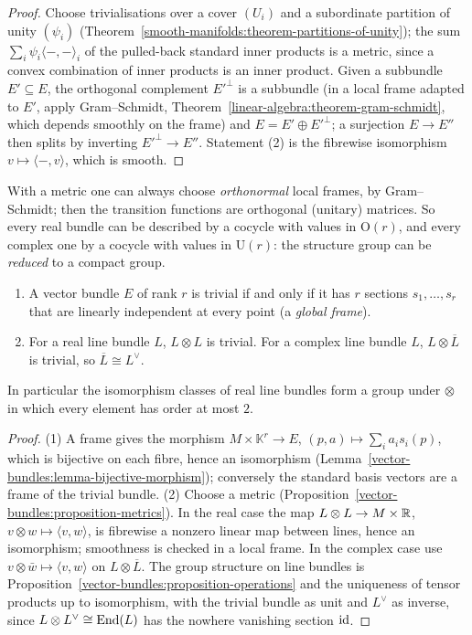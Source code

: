 \begin{proof}
Choose trivialisations over a cover $(U_i)$ and a subordinate partition of unity $(\psi_i)$ (Theorem~\ref{smooth-manifolds:theorem-partitions-of-unity}); the sum $\sum_i\psi_i\langle -, - \rangle_i$ of the
pulled-back standard inner products is a metric, since a convex combination of inner products is an inner product. Given a subbundle $E' \subseteq E$, the orthogonal complement $E'^\perp$ is a subbundle (in a
local frame adapted to $E'$, apply Gram--Schmidt, Theorem~\ref{linear-algebra:theorem-gram-schmidt}, which depends smoothly on the frame) and $E = E' \oplus E'^\perp$; a surjection $E \to E''$ then splits
by inverting $E'^\perp \to E''$. Statement (2) is the fibrewise isomorphism $v \mapsto \langle -, v \rangle$, which is smooth.
\end{proof}

With a metric one can always choose \emph{orthonormal} local frames, by Gram--Schmidt; then the transition functions are orthogonal (unitary) matrices. So every real bundle can
be described by a cocycle with values in $\mathrm{O}(r)$, and every complex one by a cocycle with values in $\mathrm{U}(r)$: the structure group can be \emph{reduced} to a compact group.

\begin{proposition}\label{vector-bundles:proposition-frames}
\begin{enumerate}
\item A vector bundle $E$ of rank $r$ is trivial if and only if it has $r$ sections $s_1, \ldots, s_r$ that are linearly independent at every point (a \emph{global frame}).
\item For a real line bundle $L$, $L \otimes L$ is trivial. For a complex line bundle $L$, $L \otimes \overline{L}$ is trivial, so $\overline{L} \cong L^\vee$.
\end{enumerate}
In particular the isomorphism classes of real line bundles form a group under $\otimes$ in which every element has order at most $2$.
\end{proposition}

\begin{proof}
(1) A frame gives the morphism $M \times \mathbb{K}^r \to E$, $(p, a) \mapsto \sum_ia_is_i(p)$, which is bijective on each fibre, hence an isomorphism
(Lemma~\ref{vector-bundles:lemma-bijective-morphism}); conversely the standard basis vectors are a frame of the trivial bundle. (2) Choose a metric (Proposition~\ref{vector-bundles:proposition-metrics}).
In the real case the map $L \otimes L \to M \times \mathbb{R}$, $v \otimes w \mapsto \langle v, w\rangle$, is fibrewise a nonzero linear map between lines, hence an isomorphism; smoothness is checked in a local frame. In the
complex case use $v \otimes \bar w \mapsto \langle v, w\rangle$ on $L \otimes \overline{L}$. The group structure on line bundles is Proposition~\ref{vector-bundles:proposition-operations} and the uniqueness of
tensor products up to isomorphism, with the trivial bundle as unit and $L^\vee$ as inverse, since $L \otimes L^\vee \cong \operatorname{End}(L)$ has the nowhere vanishing section $\mathrm{id}$.
\end{proof}

